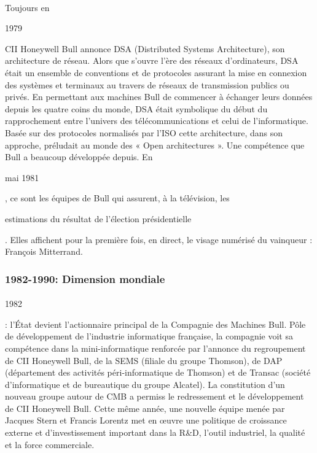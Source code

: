 \documentclass[11pt]{article}
\begin{document}
		\paragraph{}
		Toujours en \begin{bf}1979\end{bf} CII Honeywell Bull annonce DSA (Distributed Systems Architecture), son 
		architecture de réseau. Alors que s’ouvre l’ère des réseaux d’ordinateurs, DSA était un ensemble de conventions et de 
		protocoles assurant la mise en connexion des systèmes et terminaux au travers de réseaux de transmission publics ou 
		privés. En permettant aux machines Bull de commencer à échanger leurs données depuis les quatre coins du monde, DSA 
		était symbolique du début du rapprochement entre l’univers des télécommunications et celui de l’informatique. Basée 
		sur des protocoles normalisés par l’ISO cette architecture, dans son approche, préludait au monde des « Open 
		architectures ». Une compétence que Bull a beaucoup développée depuis.\newline{}
		En \begin{bf}mai 1981\end{bf}, ce sont les équipes de Bull qui assurent, à la télévision, les \begin{bf}estimations 
		du résultat de l’élection présidentielle\end{bf}. Elles affichent pour la première fois, en direct, le visage numérisé du 
		vainqueur : François Mitterrand.
		\subsubsection{1982-1990: Dimension mondiale}
		\paragraph{}
		\begin{bf}1982\end{bf}: l’État devient l’actionnaire principal de la Compagnie des Machines Bull. Pôle de 
		développement de l’industrie informatique française, la compagnie voit sa compétence dans la mini-informatique 
		renforcée par l’annonce du regroupement de CII Honeywell Bull, de la SEMS (filiale du groupe Thomson), de DAP 
		(département des activités péri-informatique de Thomson) et de Transac (société d’informatique et de bureautique du 
		groupe Alcatel). La constitution d’un nouveau groupe autour de CMB a permiss le redressement et le développement de CII 
		Honeywell Bull.\newline{}
		Cette même année, une nouvelle équipe menée par Jacques Stern et Francis Lorentz met en œuvre une politique de 
		croissance externe et d’investissement important dans la R\&D, l’outil industriel, la qualité et la force commerciale.
\end{document}
